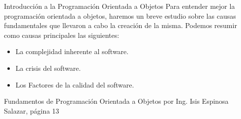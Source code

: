 \begin{frame}{Introducción a la Programación Orientada a Objetos}
\justifying
Para entender mejor la programación orientada a objetos, haremos un breve estudio sobre las causas fundamentales que llevaron a cabo la creación de la misma. Podemos resumir como causas principales las siguientes:

\begin{itemize}
\item La complejidad inherente al software.
\item La crisis del software.
\item Los Factores de la calidad del software.
\end{itemize}


{\tiny Fundamentos de Programación Orientada a Objetos por Ing. Isis Espinosa Salazar, página 13}
\end{frame}
